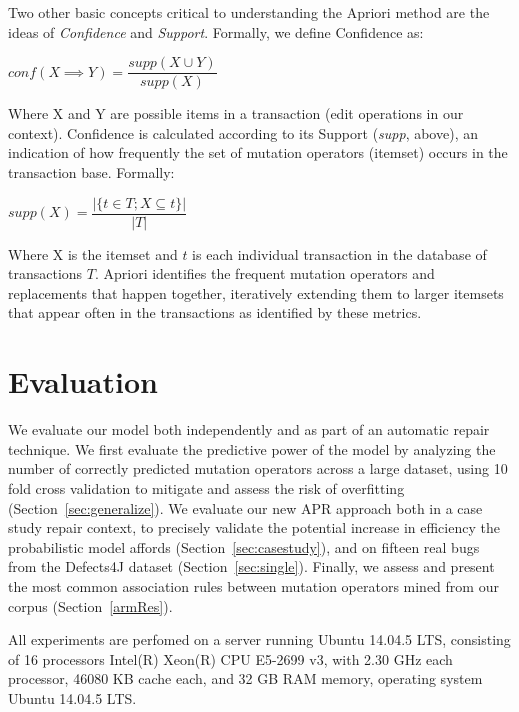 \documentclass[conference]{IEEEtran}
\begin{document}
Two other basic concepts critical to understanding the Apriori method are the
ideas of \emph{Confidence} and \emph{Support}.
Formally, we define Confidence as:

\begin{center}
$conf(X \implies Y) = \dfrac{supp(X \cup Y)}{supp(X)}$ 
\end{center}

Where X and Y are possible items in a transaction (edit operations in our
context).  Confidence is calculated according to its Support (\emph{supp}, above), 
an indication of how frequently the set of mutation operators (itemset) 
 occurs in the transaction base.
Formally:

\begin{center}
$supp(X) = \dfrac{|\{t \in T; X \subseteq t\}|}{|T|}$
\end{center}

Where X is the itemset and $t$ is each individual transaction in
the database of transactions $T$. Apriori identifies the frequent mutation
operators and replacements that happen together, iteratively extending them to larger
itemsets that appear often in the transactions as identified by these metrics.


\section{Evaluation} \label{evaluation}

We evaluate our model both independently and as part of an automatic repair
technique.  We first evaluate the predictive power of the model by analyzing the
number of correctly predicted mutation operators across a large dataset, using 10 fold cross
validation to mitigate and assess the risk of overfitting
(Section~\ref{sec:generalize}). We evaluate our new APR approach both in a case study 
repair context, to precisely validate the potential increase in efficiency the
probabilistic model affords (Section~\ref{sec:casestudy}), and 
on fifteen real bugs from the Defects4J dataset
(Section~\ref{sec:single}).  Finally, we assess and present the most common 
association rules between mutation operators mined from our corpus
(Section~\ref{armRes}). 


All experiments are perfomed on a server running Ubuntu 14.04.5 LTS, 
consisting of 16 processors Intel(R) Xeon(R) CPU E5-2699 v3, with 2.30 GHz each
processor, 46080 KB cache each, and 32 GB RAM memory, operating system Ubuntu 
14.04.5 LTS.
\end{document}
